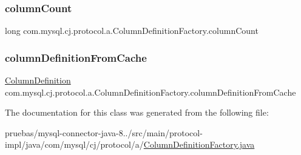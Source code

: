 \subsubsection{\texorpdfstring{column\+Count}{columnCount}}
{\footnotesize\ttfamily long com.\+mysql.\+cj.\+protocol.\+a.\+Column\+Definition\+Factory.\+column\+Count\hspace{0.3cm}{\ttfamily [protected]}}

\mbox{\label{classcom_1_1mysql_1_1cj_1_1protocol_1_1a_1_1_column_definition_factory_ad0e12e85d3b3530e1e0775eae00255de}} 
\subsubsection{\texorpdfstring{column\+Definition\+From\+Cache}{columnDefinitionFromCache}}
{\footnotesize\ttfamily \mbox{\hyperlink{interfacecom_1_1mysql_1_1cj_1_1protocol_1_1_column_definition}{Column\+Definition}} com.\+mysql.\+cj.\+protocol.\+a.\+Column\+Definition\+Factory.\+column\+Definition\+From\+Cache\hspace{0.3cm}{\ttfamily [protected]}}



The documentation for this class was generated from the following file\+:\begin{DoxyCompactItemize}
\item 
pruebas/mysql-\/connector-\/java-\/8../src/main/protocol-\/impl/java/com/mysql/cj/protocol/a/\mbox{\hyperlink{_column_definition_factory_8java}{Column\+Definition\+Factory.\+java}}\end{DoxyCompactItemize}
